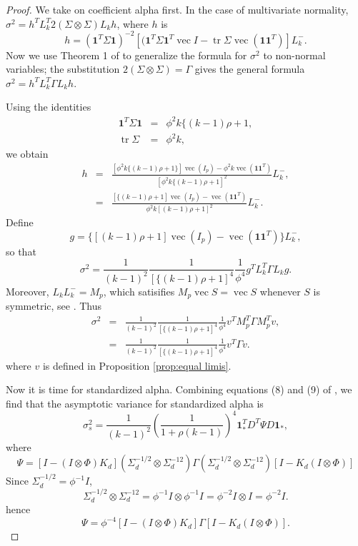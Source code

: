 \documentclass[twoside]{article}
\DeclareMathOperator{\tr}{tr}
\DeclareMathOperator{\vvec}{vec}
\begin{document}
\begin{proof}
We take on coefficient alpha first. In the case
of multivariate normality, $\sigma^{2}=h^{T}L_{k}^{T}2(\Sigma\otimes\Sigma)L_{k}h$,
where $h$ is \citep[eq. 19]{Van_Zyl2000-si}
\begin{equation*}
h = (\boldsymbol{1}^{T}\Sigma\boldsymbol{1})^{-2}[(\boldsymbol{1}^{T}\Sigma\boldsymbol{1}^{T}\vvec I-\tr\Sigma\vvec(\boldsymbol{1}\boldsymbol{1}^{T})]L_{k}^{-}.
\end{equation*}
Now we use Theorem 1 of \citet{Neudecker1990-ph} to generalize the formula for $\sigma^2$ to non-normal variables; the substitution
$2(\Sigma\otimes\Sigma)=\Gamma$ gives the general formula $\sigma^{2}=h^{T}L_{k}^{T}\Gamma L_{k}h.$

Using the identities
\begin{eqnarray*}
\boldsymbol{1}^{T}\Sigma\boldsymbol{1} & = & \phi^{2}k\{(k-1)\rho+1,\\
\tr\Sigma & = & \phi^{2}k,
\end{eqnarray*}
we obtain
\begin{eqnarray*}
h & = & \frac{[\phi^{2}k\{(k-1)\rho+1\}]\vvec(I_{p})-\phi^{2}k\vvec(\boldsymbol{1}\boldsymbol{1}^{T})}{[\phi^{2}k\{(k-1)\rho+1]^{2}}L_{k}^{-},\\
 & = & \frac{[\{(k-1)\rho+1]\vvec(I_{p})-\vvec(\boldsymbol{1}\boldsymbol{1}^{T})}{\phi^{2}k[(k-1)\rho+1]^{2}}L_{k}^{-}.
\end{eqnarray*}
Define
\[
g=\{[(k-1)\rho+1]\vvec(I_{p})-\vvec(\boldsymbol{1}\boldsymbol{1}^{T})\}L_{k}^{-},
\]
so that
\[
\sigma^{2}=\frac{1}{(k-1)^{2}}\frac{1}{[\{(k-1)\rho+1]^{4}}\frac{1}{\phi^{4}}g^{T}L_{k}^{T}\Gamma L_{k}g.
\]
Moreover, $L_{k}L_{k}^{-}=M_{p}$, which satisifies $M_{p}\vvec S=\vvec S$
whenever $S$ is symmetric, see \citet[p. 275]{Van_Zyl2000-si}. Thus 
\begin{eqnarray*}
\sigma^{2} & = & \frac{1}{(k-1)^{2}}\frac{1}{[\{(k-1)\rho+1]^{4}}\frac{1}{\phi^{4}}v^{T}M_{p}^{T}\Gamma M_{p}^{T}v,\\
 & = & \frac{1}{(k-1)^{2}}\frac{1}{[\{(k-1)\rho+1]^{4}}\frac{1}{\phi^{4}}v^{T}\Gamma v.
\end{eqnarray*} where $v$ is defined in Proposition \ref{prop:equal limis}.

Now it is time for standardized alpha. Combining equations (8) and (9) of \citet{hayashi2005note},
we find that the asymptotic variance for standardized alpha is
\begin{equation*}
\sigma_{s}^{2}=\frac{1}{(k-1)^{2}}\left(\frac{1}{1+\rho(k-1)}\right)^{4}\boldsymbol{1}_{*}^{T}D^{T}\Psi D\boldsymbol{1}_{*},\label{eq:standardized alpha variance 3}
\end{equation*}
where 
\[
\Psi=[I-(I\otimes\Phi)K_{d}](\Sigma_{d}^{-1/2}\otimes\Sigma_{d}^{-12})\Gamma(\Sigma_{d}^{-1/2}\otimes\Sigma_{d}^{-12})[I-K_{d}(I\otimes\Phi)]
\]
Since $\Sigma_{d}^{-1/2}=\phi^{-1}I$,
\[
\Sigma_{d}^{-1/2}\otimes\Sigma_{d}^{-12}=\phi^{-1}I\otimes\phi^{-1}I=\phi^{-2}I\otimes I=\phi^{-2}I.
\]
hence 
\[
\Psi=\phi^{-4}[I-(I\otimes\Phi)K_{d}]\Gamma[I-K_{d}(I\otimes\Phi)].
\]
\end{proof}
\end{document}

